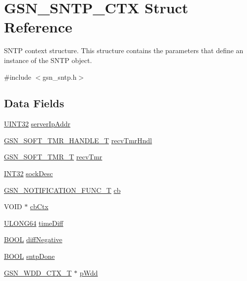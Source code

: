 \hypertarget{a00227}{
\section{GSN\_\-SNTP\_\-CTX Struct Reference}
\label{a00227}
}


SNTP context structure. This structure contains the parameters that define an instance of the SNTP object.  




{\ttfamily \#include $<$gsn\_\-sntp.h$>$}

\subsection*{Data Fields}
\begin{DoxyCompactItemize}
\item 
\hyperlink{a00660_gae1e6edbbc26d6fbc71a90190d0266018}{UINT32} \hyperlink{a00227_a09261ac30de0001f89753c8f3869ad2f}{serverIpAddr}
\item 
\hyperlink{a00229}{GSN\_\-SOFT\_\-TMR\_\-HANDLE\_\-T} \hyperlink{a00227_a99352b33eae768a9ac49ad9cd195a03f}{recvTmrHndl}
\item 
\hyperlink{a00229}{GSN\_\-SOFT\_\-TMR\_\-T} \hyperlink{a00227_aceccc0d31027efd5c8c774981cb782f3}{recvTmr}
\item 
\hyperlink{a00660_ga63021d67d54286c2163bcdb43a6f2569}{INT32} \hyperlink{a00227_a4664a1e7fa506ea9a7864c6847d8af4b}{sockDesc}
\item 
\hyperlink{a00481_aac7371fae4e423f90332caf551b62cf1}{GSN\_\-NOTIFICATION\_\-FUNC\_\-T} \hyperlink{a00227_a44a3261584f04cfe1ae8e254fcea6b61}{cb}
\item 
VOID $\ast$ \hyperlink{a00227_abc1717c5357c7dda5c2abef096a06f1f}{cbCtx}
\item 
\hyperlink{a00660_ga28961430434ccabca6862ea93fe9a15b}{ULONG64} \hyperlink{a00227_aa1d801da8079e893c423290b7f12041d}{timeDiff}
\item 
\hyperlink{a00660_ga1f04022c0a182c51c059438790ea138c}{BOOL} \hyperlink{a00227_ab4a2b87d4c1759e4e8bd2e472d2a0985}{diffNegative}
\item 
\hyperlink{a00660_ga1f04022c0a182c51c059438790ea138c}{BOOL} \hyperlink{a00227_a25ee748bd783b7df54ec68bcade63962}{sntpDone}
\item 
\hyperlink{a00108}{GSN\_\-WDD\_\-CTX\_\-T} $\ast$ \hyperlink{a00227_a97684b58b7a05f9b282a86a26929e1ba}{pWdd}
\end{DoxyCompactItemize}



